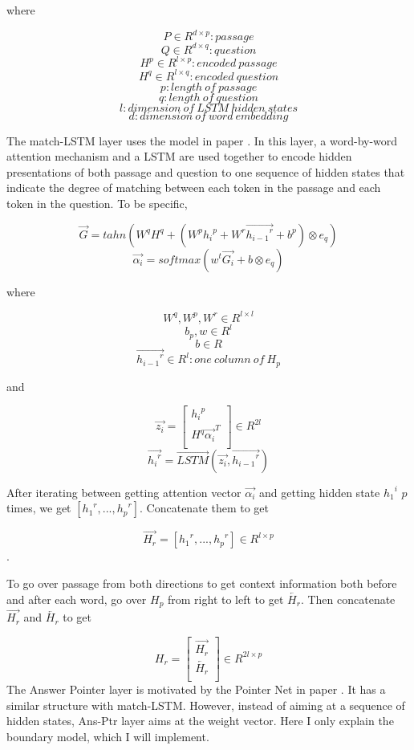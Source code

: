 \documentclass[12pt]{article}
\begin{document}
where

 $$P\in R^{d \times p}: passage$$
 $$Q\in R^{d \times q}: question$$
 $$H^p\in R^{l \times p}: encoded\ passage$$
 $$H^q\in R^{l \times q}: encoded\ question$$
 $$p: length \ of\ passage$$
 $$q: length\ of\ question$$
 $$l: dimension\ of\ LSTM\ hidden\ states$$
 $$d: dimension\ of\ word\ embedding$$

The match-LSTM layer uses the model in paper \cite{wang2015learning}. In this layer, a word-by-word attention mechanism and a LSTM are used together to encode hidden presentations of both passage and question to one sequence of hidden states that indicate the degree of matching between each token in the passage and each token in the question. To be specific,

$$\overrightarrow{G} = tahn(W^qH^q + (W^p{h_i}^p + W^r\overrightarrow{{h_{i-1}}^r} + b^p) \otimes e_q)$$
$$\overrightarrow{\alpha _i} = softmax(w^t\overrightarrow{G_i} + b \otimes e_q)$$


where

$$W^q, W^p, W^r\in R^{l \times l} $$
$$b_p, w\in R^{l}  $$
$$b \in R $$
$$\overrightarrow{{h_{i-1}}^r}\in R^{l}: one\ column\ of\ H_p  $$

and

\[ \overrightarrow{z_i} =
\begin{bmatrix}
{h_i}^p \\
H^q\overrightarrow{ {\alpha _i}}^T \\
\end{bmatrix}
\in R^{2l}
\]
$$\overrightarrow{{h_i}^r} = \overrightarrow{LSTM}(\overrightarrow{z_i}, \overrightarrow{{h_{i-1}}^r})$$

After iterating between getting attention vector $\overrightarrow{\alpha _i}$ and getting hidden state ${{h_{1}}^i}$ $p$ times, we get $[{{h_{1}}^r}, ..., {{h_{p}}^r}]$. Concatenate them to get

$$\overrightarrow{H_r} = [{{h_{1}}^r}, ..., {{h_{p}}^r}] \in R^{l \times p}$$.

To go over passage from both directions to get context information both before and after each word, go over $H_p$ from right to left to get $\overleftarrow{H_r}$. Then concatenate $\overrightarrow{H_r}$ and $\overleftarrow{H_r}$ to get

\[ H_r =
\begin{bmatrix}
\overrightarrow{H_r} \\
\overleftarrow{H_r} \\
\end{bmatrix}
\in R^{2l \times p}
\]
The Answer Pointer layer is motivated by the Pointer Net in paper \cite{vinyals2015pointer}. It has a similar structure with match-LSTM. However, instead of aiming at a sequence of hidden states, Ans-Ptr layer aims at the weight vector. Here I only explain the boundary model, which I will implement.
\end{document}
